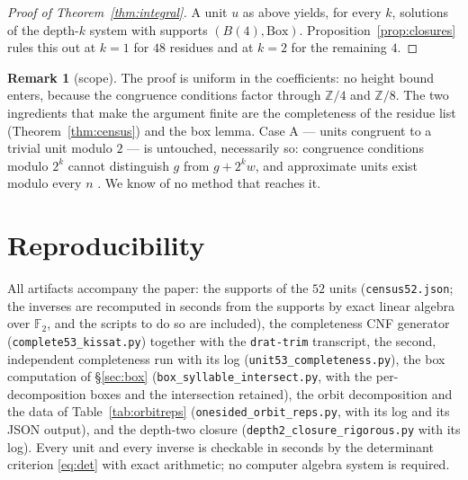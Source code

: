 \documentclass[11pt]{amsart}
\theoremstyle{definition}
\newtheorem{remark}[theorem]{Remark}
\newcommand{\F}{\mathbb{F}}
\newcommand{\Z}{\mathbb{Z}}
\newcommand{\Ball}[1]{B(#1)}
\newcommand{\BOX}{\mathrm{Box}}
\begin{document}
\begin{proof}[Proof of Theorem~\ref{thm:integral}]
A unit $u$ as above yields, for every $k$, solutions of the depth-$k$ system
with supports $(\Ball4,\BOX)$. Proposition~\ref{prop:closures} rules this out
at $k=1$ for $48$ residues and at $k=2$ for the remaining $4$.
\end{proof}

\begin{remark}[scope]
The proof is uniform in the coefficients: no height bound enters, because the
congruence conditions factor through $\Z/4$ and $\Z/8$. The two ingredients
that make the argument finite are the completeness of the residue list
(Theorem~\ref{thm:census}) and the box lemma. Case A --- units congruent to a
trivial unit modulo $2$ --- is untouched, necessarily so: congruence conditions
modulo $2^k$ cannot distinguish $g$ from $g+2^k w$, and approximate units exist
modulo every $n$ \cite[Prop.~3.1]{Bartholdi2022}. We know of no method that reaches it.
\end{remark}

\section{Reproducibility}

All artifacts accompany the paper: the supports of the $52$ units
(\texttt{census52.json}; the inverses are recomputed in seconds from the
supports by exact linear algebra over $\F_2$, and the scripts to do so are
included), the completeness CNF generator
(\texttt{complete53\_kissat.py}) together with the \texttt{drat-trim}
transcript, the second, independent completeness run with its log
(\texttt{unit53\_completeness.py}), the box computation of
\S\ref{sec:box} (\texttt{box\_syllable\_intersect.py}, with the
per-decomposition boxes and the intersection retained), the orbit
decomposition and the data of
Table~\ref{tab:orbitreps} (\texttt{onesided\_orbit\_reps.py}, with its log
and its JSON output), and the depth-two closure
(\texttt{depth2\_closure\_rigorous.py} with its log). Every unit and every inverse is checkable in seconds by the
determinant criterion \eqref{eq:det} with exact arithmetic; no computer algebra
system is required.
\end{document}
